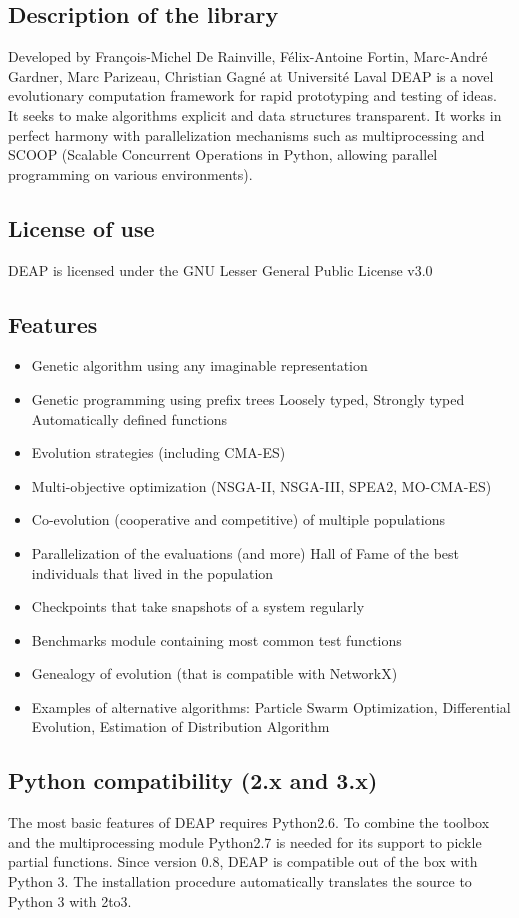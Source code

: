 \documentclass{article}
\begin{document}
\subsection{Description of the library}
Developed by François-Michel De Rainville, Félix-Antoine Fortin, Marc-André Gardner, Marc Parizeau, Christian Gagné at Université Laval 
DEAP is a novel evolutionary computation framework for rapid prototyping and testing of ideas. It seeks to make algorithms explicit and data structures transparent. It works in perfect harmony with parallelization mechanisms such as multiprocessing and SCOOP (Scalable Concurrent Operations in Python, allowing parallel programming on various environments).
\subsection{License of use}
 DEAP is licensed under the
GNU Lesser General Public License v3.0
\subsection{Features}
    \begin{itemize}
        \item Genetic algorithm using any imaginable representation
        \item Genetic programming using prefix trees
            \subitem Loosely typed, Strongly typed
            \subitem Automatically defined functions
        \item Evolution strategies (including CMA-ES)
        \item Multi-objective optimization (NSGA-II, NSGA-III, SPEA2, MO-CMA-ES)
        \item Co-evolution (cooperative and competitive) of multiple populations
        \item Parallelization of the evaluations (and more)
        Hall of Fame of the best individuals that lived in the population
        \item Checkpoints that take snapshots of a system regularly
        \item Benchmarks module containing most common test functions
        \item Genealogy of evolution (that is compatible with NetworkX)
        \item Examples of alternative algorithms: Particle Swarm Optimization, Differential Evolution, Estimation of Distribution Algorithm
    \end{itemize}
\subsection{Python compatibility (2.x and 3.x)}
The most basic features of DEAP requires Python2.6. To combine the toolbox and the multiprocessing module Python2.7 is needed for its support to pickle partial functions. 
Since version 0.8, DEAP is compatible out of the box with Python 3. The installation procedure automatically translates the source to Python 3 with 2to3.
\end{document}
